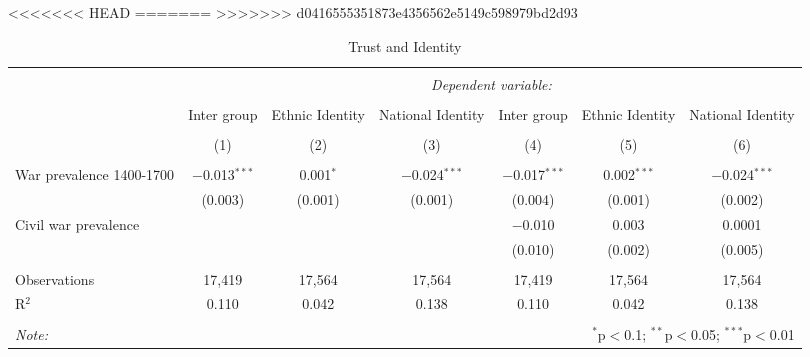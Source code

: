 
<<<<<<< HEAD
=======
>>>>>>> d0416555351873e4356562e5149c598979bd2d93
\begin{table}[!htbp] \centering 
  \caption{Trust and Identity} 
  \label{} 
\footnotesize 
\begin{tabular}{@{\extracolsep{2pt}}lcccccc} 
\\[-1.8ex]\hline 
\hline \\[-1.8ex] 
 & \multicolumn{6}{c}{\textit{Dependent variable:}} \\ 
\cline{2-7} 
\\[-1.8ex] & Inter group & Ethnic Identity & National Identity & Inter group & Ethnic Identity & National Identity \\ 
\\[-1.8ex] & (1) & (2) & (3) & (4) & (5) & (6)\\ 
\hline \\[-1.8ex] 
 War prevalence 1400-1700 & $-$0.013$^{***}$ & 0.001$^{*}$ & $-$0.024$^{***}$ & $-$0.017$^{***}$ & 0.002$^{***}$ & $-$0.024$^{***}$ \\ 
  & (0.003) & (0.001) & (0.001) & (0.004) & (0.001) & (0.002) \\ 
  Civil war prevalence &  &  &  & $-$0.010 & 0.003 & 0.0001 \\ 
  &  &  &  & (0.010) & (0.002) & (0.005) \\ 
 \hline \\[-1.8ex] 
Observations & 17,419 & 17,564 & 17,564 & 17,419 & 17,564 & 17,564 \\ 
R$^{2}$ & 0.110 & 0.042 & 0.138 & 0.110 & 0.042 & 0.138 \\ 
\hline 
\hline \\[-1.8ex] 
\textit{Note:}  & \multicolumn{6}{r}{$^{*}$p$<$0.1; $^{**}$p$<$0.05; $^{***}$p$<$0.01} \\ 
\end{tabular} 
\end{table} 
